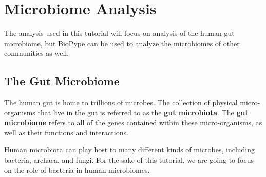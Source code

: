 
\chapter{Microbiome Analysis}
The analysis used in this tutorial will focus on analysis of the human gut microbiome, but BioPype can be used to analyze the microbiomes of other communities as well.
\section{The Gut Microbiome}
%
%
The human gut is home to trillions of microbes. The collection of physical micro-organisms that live in the gut is referred to as the \textbf{gut microbiota}. The \textbf{gut microbiome} refers to all of the genes contained within these micro-organisms, as well as their functions and interactions.

%
Human microbiota can play host to many different kinds of microbes, including bacteria, archaea, and fungi. For the sake of this tutorial, we are going to focus on the role of bacteria in human microbiomes.


